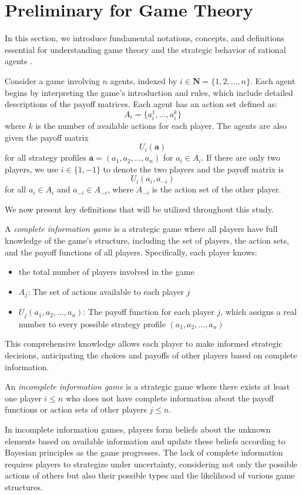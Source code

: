 \section{Preliminary for Game Theory}
\label{sec:preliminary}
In this section, we introduce fundamental notations, concepts, and definitions essential for understanding game theory and the strategic behavior of rational agents \cite{von2007theory, luce2012games}.

Consider a game involving $n$ agents, indexed by $i\in\mathbf{N} = \{1,2, \dots, n\}$. Each agent begins by interpreting the game's introduction and rules, which include detailed descriptions of the payoff matrices. Each agent has an action set defined as: $$A_i = \{a_i^1, \dots, a_i^k\}$$ where $k$ is the number of available actions for each player. The agents are also given the payoff matrix $$U_i(\mathbf{a})$$ for all strategy profiles $\mathbf{a} = (a_1,a_2, \dots, a_n)$ for $a_i\in A_i$. If there are only two players, we use $i\in \{1, -1\}$ to denote the two players and the payoff matrix is $$U_i(a_i, a_{-i})$$ for all $a_i\in A_i$ and $a_{-i}\in A_{-i}$, where $A_{-i}$ is the action set of the other player.

We now present key definitions that will be utilized throughout this study.

\begin{definition}
A \emph{complete information game} is a strategic game where all players have full knowledge of the game's structure, including the set of players, the action sets, and the payoff functions of all players. Specifically, each player knows:
\begin{itemize}
    \item the total number of players involved in the game
    \item $A_j$: The set of actions available to each player $j$
    \item $U_j(a_1,a_2,\dots,a_n)$: The payoff function for each player $j$, which assigns a real number to every possible strategy profile $(a_1, a_2, \dots, a_n)$
\end{itemize}

This comprehensive knowledge allows each player to make informed strategic decisions, anticipating the choices and payoffs of other players based on complete information.
\end{definition}

\begin{definition}
An \emph{incomplete information game} is a strategic game where  there exists at least one player $i\leq n$ who does not have complete information about the payoff functions or action sets of other players $j\leq n$.

In incomplete information games, players form beliefs about the unknown elements based on available information and update these beliefs according to Bayesian principles as the game progresses. The lack of complete information requires players to strategize under uncertainty, considering not only the possible actions of others but also their possible types and the likelihood of various game structures.
\end{definition}

